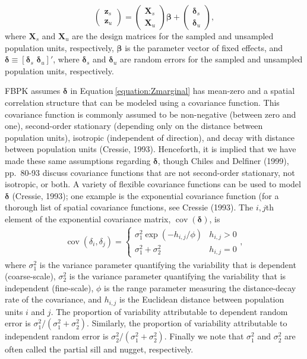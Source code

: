 \documentclass[]{elsarticle} %
\begin{document}
\begin{equation}
\begin{pmatrix} \label{equation:Zmarginal}
    \mathbf{z}_s      \\
    \mathbf{z}_u
\end{pmatrix}
=
\begin{pmatrix}
  \mathbf{X}_s    \\
  \mathbf{X}_u
\end{pmatrix}
\bm{\beta} +
\begin{pmatrix}
\bm{\delta}_s    \\
\bm{\delta}_u
\end{pmatrix},
\end{equation} where \(\mathbf{X}_s\) and \(\mathbf{X}_u\) are the
design matrices for the sampled and unsampled population units,
respectively, \(\bm{\beta}\) is the parameter vector of fixed effects,
and \(\bm{\delta} \equiv [\bm{\delta}_s \,\, \bm{\delta}_u]'\), where
\(\bm{\delta}_s\) and \(\bm{\delta}_u\) are random errors for the
sampled and unsampled population units, respectively.

FBPK assumes \(\bm{\delta}\) in Equation\(~\)\ref{equation:Zmarginal}
has mean-zero and a spatial correlation structure that can be modeled
using a covariance function. This covariance function is commonly
assumed to be non-negative (between zero and one), second-order
stationary (depending only on the distance between population units),
isotropic (independent of direction), and decay with distance between
population units (Cressie, 1993). Henceforth, it is implied that we have
made these same assumptions regarding \(\bm{\delta}\), though Chiles and
Delfiner (1999), pp.~80-93 discuss covariance functions that are not
second-order stationary, not isotropic, or both. A variety of flexible
covariance functions can be used to model \(\bm{\delta}\) (Cressie,
1993); one example is the exponential covariance function (for a
thorough list of spatial covariance functions, see Cressie (1993). The
\(i,j\)th element of the exponential covariance matrix,
\(\mathop{\mathrm{{cov}}}(\bm{\delta})\), is \mbox{}
\begin{align}\label{equation:expcov}
\mathop{\mathrm{{cov}}}(\delta_i, \delta_j) = 
\begin{cases} 
\sigma^2_{1}\exp(-h_{i,j}/\phi) & h_{i,j} > 0 \\
\sigma^2_{1} + \sigma^2_2 & h_{i,j} = 0
\end{cases}
,
\end{align} where \(\sigma^2_{1}\) is the variance parameter quantifying
the variability that is dependent (coarse-scale), \(\sigma^2_{2}\) is
the variance parameter quantifying the variability that is independent
(fine-scale), \(\phi\) is the range parameter measuring the
distance-decay rate of the covariance, and \(h_{i,j}\) is the Euclidean
distance between population units \(i\) and \(j\). The proportion of
variability attributable to dependent random error is
\(\sigma^2_{1} / (\sigma^2_{1} + \sigma^2_{2})\). Similarly, the
proportion of variability attributable to independent random error is
\(\sigma^2_{2} / (\sigma^2_{1} + \sigma^2_{2})\). Finally we note that
\(\sigma^2_{1}\) and \(\sigma^2_{2}\) are often called the partial sill
and nugget, respectively.
\end{document}
